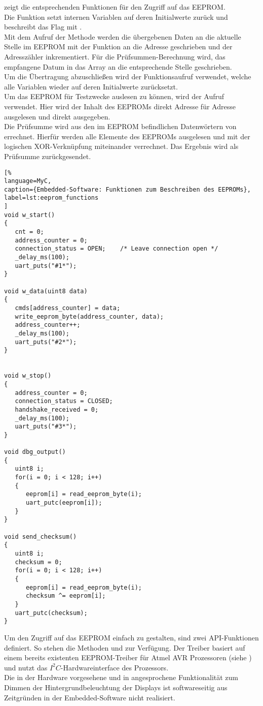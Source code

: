  zeigt die entsprechenden Funktionen für den Zugriff auf das EEPROM.\\
Die Funktion  setzt internen Variablen auf deren Initialwerte zurück und beschreibt das Flag   mit .\\
Mit dem Aufruf der Methode  werden die übergebenen Daten  an die aktuelle Stelle im EEPROM mit der Funktion  an die Adresse  geschrieben und der Adresszähler inkrementiert. Für die Prüfsummen-Berechnung wird, das empfangene Datum in das Array  an die entsprechende Stelle geschrieben.\\
Um die Übertragung abzuschließen wird der Funktionsaufruf  verwendet, welche alle Variablen wieder auf deren Initialwerte zurücksetzt.\\
Um das EEPROM für Testzwecke auslesen zu können, wird der Aufruf  verwendet. Hier wird der Inhalt des EEPROMs direkt Adresse für Adresse ausgelesen und direkt ausgegeben.\\
Die Prüfsumme wird aus den im EEPROM befindlichen Datenwörtern von errechnet. Hierfür werden alle Elemente des EEPROMs ausgelesen und mit der logischen XOR-Verknüpfung miteinander verrechnet. Das Ergebnis wird als Prüfsumme zurückgesendet. 

\begin{lstlisting}[%
language=MyC,
caption={Embedded-Software: Funktionen zum Beschreiben des EEPROMs},
label=lst:eeprom_functions
]
void w_start()
{
   cnt = 0;
   address_counter = 0;
   connection_status = OPEN;    /* Leave connection open */
   _delay_ms(100);
   uart_puts("#1*");
}

void w_data(uint8 data)
{
   cmds[address_counter] = data;
   write_eeprom_byte(address_counter, data);
   address_counter++;
   _delay_ms(100);
   uart_puts("#2*");
}


void w_stop()
{
   address_counter = 0;
   connection_status = CLOSED;
   handshake_received = 0;
   _delay_ms(100);
   uart_puts("#3*");
}

void dbg_output()
{
   uint8 i;
   for(i = 0; i < 128; i++)
   {
      eeprom[i] = read_eeprom_byte(i);
      uart_putc(eeprom[i]);
   }
}

void send_checksum()
{
   uint8 i;
   checksum = 0;
   for(i = 0; i < 128; i++)
   {
      eeprom[i] = read_eeprom_byte(i);
      checksum ^= eeprom[i];
   }
   uart_putc(checksum);
}
\end{lstlisting}%
Um den Zugriff auf das EEPROM einfach zu gestalten, sind zwei API-Funktionen definiert. So stehen die Methoden  und  zur Verfügung. Der Treiber basiert auf einem bereits existenten EEPROM-Treiber für Atmel AVR Prozessoren (siehe \cite{eeprom_lib}) und nutzt das $I^2C$-Hardwareinterface des Prozessors. \\
Die in der Hardware vorgesehene und in  angesprochene Funktionalität zum Dimmen der Hintergrundbeleuchtung der Displays ist softwareseitig aus Zeitgründen in der Embedded-Software nicht realisiert. 
